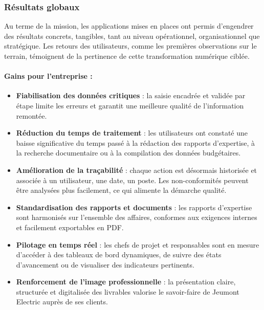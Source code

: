 \documentclass[11pt,a4paper]{article}
\begin{document}
\newpage
\subsubsection{Résultats globaux}

Au terme de la mission, les applications mises en places ont permis d’engendrer des résultats concrets, tangibles, tant au niveau opérationnel, organisationnel que stratégique. Les retours des utilisateurs, comme les premières observations sur le terrain, témoignent de la pertinence de cette transformation numérique ciblée.

\paragraph{Gains pour l’entreprise :}

\begin{itemize}
    \item \textbf{Fiabilisation des données critiques} : la saisie encadrée et validée par étape limite les erreurs et garantit une meilleure qualité de l’information remontée.

    \item \textbf{Réduction du temps de traitement} : les utilisateurs ont constaté une baisse significative du temps passé à la rédaction des rapports d’expertise, à la recherche documentaire ou à la compilation des données budgétaires.

    \item \textbf{Amélioration de la traçabilité} : chaque action est désormais historisée et associée à un utilisateur, une date, un poste. Les non-conformités peuvent être analysées plus facilement, ce qui alimente la démarche qualité.

    \item \textbf{Standardisation des rapports et documents} : les rapports d’expertise sont harmonisés sur l’ensemble des affaires, conformes aux exigences internes et facilement exportables en PDF.

    \item \textbf{Pilotage en temps réel} : les chefs de projet et responsables sont en mesure d’accéder à des tableaux de bord dynamiques, de suivre des états d’avancement ou de visualiser des indicateurs pertinents.

    \item \textbf{Renforcement de l’image professionnelle} : la présentation claire, structurée et digitalisée des livrables valorise le savoir-faire de Jeumont Electric auprès de ses clients.
\end{itemize}
\end{document}
